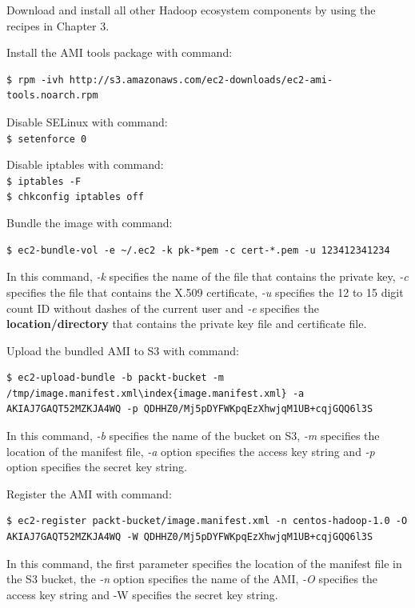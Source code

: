 Download and install all other Hadoop ecosystem components by using the recipes in Chapter 3.

Install the AMI tools package with command:
\lstset{style=bashstyle}
\begin{lstlisting}
$ rpm -ivh http://s3.amazonaws.com/ec2-downloads/ec2-ami-tools.noarch.rpm
\end{lstlisting}

Disable SELinux with command:\\
\verb|$ setenforce 0|

Disable iptables with command: \\
\verb|$ iptables -F| \\
\verb|$ chkconfig iptables off|

Bundle the image with command:
\lstset{style=bashstyle}
\begin{lstlisting}
$ ec2-bundle-vol -e ~/.ec2 -k pk-*pem -c cert-*.pem -u 123412341234
\end{lstlisting}

In this command, \emph{-k} specifies the name of the file that contains the private key, \emph{-c} specifies the file that contains the X.509 certificate, \emph{-u} specifies the 12 to 15 digit count ID without dashes of the current user and \emph{-e} specifies the \textbf{location/directory} that contains the private key file and certificate file.

Upload the bundled AMI to S3 with command: 
\lstset{style=bashstyle}
\begin{lstlisting}
$ ec2-upload-bundle -b packt-bucket -m /tmp/image.manifest.xml\index{image.manifest.xml} -a AKIAJ7GAQT52MZKJA4WQ -p QDHHZ0/Mj5pDYFWKpqEzXhwjqM1UB+cqjGQQ6l3S
\end{lstlisting}

In this command, \emph{-b} specifies the name of the bucket on S3, \emph{-m} specifies the location of the manifest file, \emph{-a} option specifies the access key string and \emph{-p} option specifies the secret key string.

Register the AMI with command:
\lstset{style=bashstyle}
\begin{lstlisting}
$ ec2-register packt-bucket/image.manifest.xml -n centos-hadoop-1.0 -O AKIAJ7GAQT52MZKJA4WQ -W QDHHZ0/Mj5pDYFWKpqEzXhwjqM1UB+cqjGQQ6l3S
\end{lstlisting}

In this command, the first parameter specifies the location of the manifest file in the S3 bucket, the \emph{-n} option specifies the name of the AMI, \emph{-O} specifies the access key string and -W specifies the secret key string.

